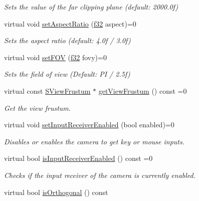\begin{DoxyCompactItemize}
\begin{DoxyCompactList}\small\item\em Sets the value of the far clipping plane (default\+: 2000.\+0f) \end{DoxyCompactList}\item 
virtual void \hyperlink{classirr_1_1scene_1_1ICameraSceneNode_a5c3728a61a208376b9df6a701f4a5b3c}{set\+Aspect\+Ratio} (\hyperlink{namespaceirr_a0277be98d67dc26ff93b1a6a1d086b07}{f32} aspect)=0
\begin{DoxyCompactList}\small\item\em Sets the aspect ratio (default\+: 4.\+0f / 3.\+0f) \end{DoxyCompactList}\item 
virtual void \hyperlink{classirr_1_1scene_1_1ICameraSceneNode_a43ee11523e9cf842d4b5d8c6a572241c}{set\+F\+OV} (\hyperlink{namespaceirr_a0277be98d67dc26ff93b1a6a1d086b07}{f32} fovy)=0
\begin{DoxyCompactList}\small\item\em Sets the field of view (Default\+: PI / 2.\+5f) \end{DoxyCompactList}\item 
virtual const \hyperlink{structirr_1_1scene_1_1SViewFrustum}{S\+View\+Frustum} $\ast$ \hyperlink{classirr_1_1scene_1_1ICameraSceneNode_a8157c6a5d7d3dbc137c046350551b825}{get\+View\+Frustum} () const  =0
\begin{DoxyCompactList}\small\item\em Get the view frustum. \end{DoxyCompactList}\item 
virtual void \hyperlink{classirr_1_1scene_1_1ICameraSceneNode_a5b5c89233c1805676d6fcb392236dfec}{set\+Input\+Receiver\+Enabled} (bool enabled)=0
\begin{DoxyCompactList}\small\item\em Disables or enables the camera to get key or mouse inputs. \end{DoxyCompactList}\item 
virtual bool \hyperlink{classirr_1_1scene_1_1ICameraSceneNode_a7a5a369f6832d78512194bcc029bf232}{is\+Input\+Receiver\+Enabled} () const  =0\hypertarget{classirr_1_1scene_1_1ICameraSceneNode_a7a5a369f6832d78512194bcc029bf232}{}\label{classirr_1_1scene_1_1ICameraSceneNode_a7a5a369f6832d78512194bcc029bf232}

\begin{DoxyCompactList}\small\item\em Checks if the input receiver of the camera is currently enabled. \end{DoxyCompactList}\item 
virtual bool \hyperlink{classirr_1_1scene_1_1ICameraSceneNode_a6d3054077c7514f05101644e143b1ab8}{is\+Orthogonal} () const \hypertarget{classirr_1_1scene_1_1ICameraSceneNode_a6d3054077c7514f05101644e143b1ab8}{}\label{classirr_1_1scene_1_1ICameraSceneNode_a6d3054077c7514f05101644e143b1ab8}


\end{DoxyCompactItemize}
